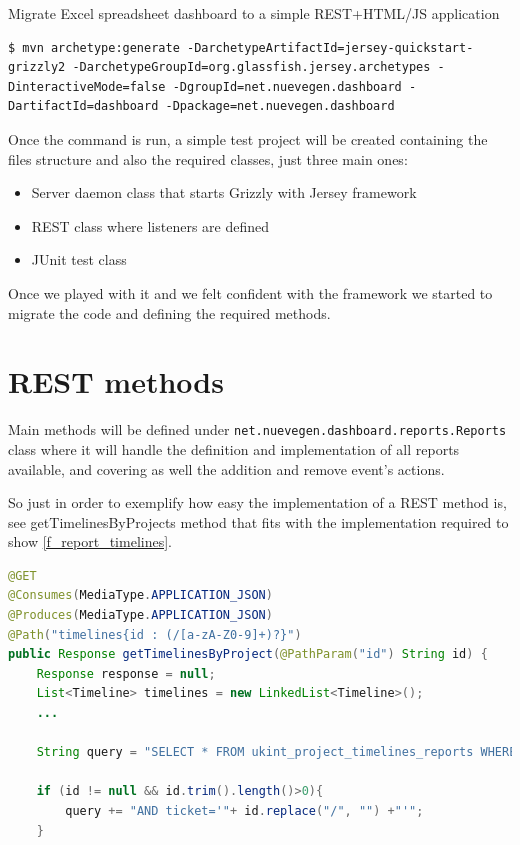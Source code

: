 \begin{part}{Migrate Excel spreadsheet dashboard to a simple REST+HTML/JS
application}
\begin{lstlisting}[style=console,caption=Grizzly\ and\ Jersey\ First\ setup,label=f_setup_grizzlyjersey] 
$ mvn archetype:generate -DarchetypeArtifactId=jersey-quickstart-grizzly2 -DarchetypeGroupId=org.glassfish.jersey.archetypes -DinteractiveMode=false -DgroupId=net.nuevegen.dashboard -DartifactId=dashboard -Dpackage=net.nuevegen.dashboard 
\end{lstlisting}

Once the command is run, a simple test project will be created containing the
files structure and also the required classes, just three main ones: 
\begin{itemize}
  \item Server daemon class that starts Grizzly with Jersey framework
  \item REST class where listeners are defined
  \item JUnit test class
\end{itemize}

Once we played with it and we felt confident with the framework we started
to migrate the code and defining the required methods.

\section{REST methods}
Main methods will be defined under
\texttt{net.nuevegen.dashboard.reports.Reports} class where it will handle
the definition and implementation of all reports available, and covering as well
the addition and remove event's actions. 

So just in order to exemplify how easy the implementation of a REST method is,
see getTimelinesByProjects method that fits with the implementation required to
show \ref{f_report_timelines}.\\

\begin{lstlisting}[language=Java,breaklines=true,caption=Reports.getTimelinesByProjects(),label=f_migration_gettimelines]
@GET
@Consumes(MediaType.APPLICATION_JSON)
@Produces(MediaType.APPLICATION_JSON)
@Path("timelines{id : (/[a-zA-Z0-9]+)?}")
public Response getTimelinesByProject(@PathParam("id") String id) {
	Response response = null;
	List<Timeline> timelines = new LinkedList<Timeline>(); 
	...

	String query = "SELECT * FROM ukint_project_timelines_reports WHERE 1 ";

	if (id != null && id.trim().length()>0){
		query += "AND ticket='"+ id.replace("/", "") +"'";
	}
	

\end{lstlisting}
\end{part}
